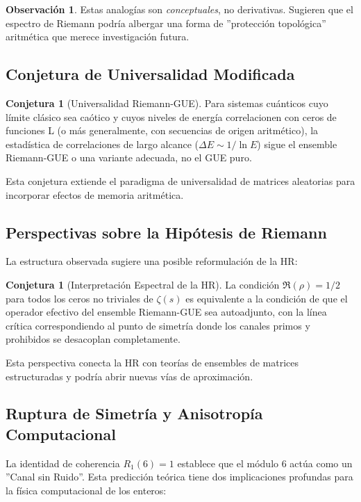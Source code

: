 \documentclass[12pt, a4paper]{article}
\theoremstyle{plain}
\theoremstyle{definition}
\newtheorem{observacion}[teorema]{Observación}
\newtheorem{conjetura}[teorema]{Conjetura}
\begin{document}
\begin{observacion}
Estas analogías son \textit{conceptuales}, no derivativas. Sugieren que el espectro de Riemann podría albergar una forma de ''protección topológica'' aritmética que merece investigación futura.
\end{observacion}

\subsection{Conjetura de Universalidad Modificada}

\begin{conjetura}[Universalidad Riemann-GUE]
Para sistemas cuánticos cuyo límite clásico sea caótico y cuyos niveles de energía correlacionen con ceros de funciones L (o más generalmente, con secuencias de origen aritmético), la estadística de correlaciones de largo alcance ($\Delta E \sim 1/\ln E$) sigue el ensemble Riemann-GUE o una variante adecuada, no el GUE puro.
\end{conjetura}

Esta conjetura extiende el paradigma de universalidad de matrices aleatorias para incorporar efectos de memoria aritmética.

\subsection{Perspectivas sobre la Hipótesis de Riemann}

La estructura observada sugiere una posible reformulación de la HR:

\begin{conjetura}[Interpretación Espectral de la HR]
La condición $\Re(\rho)=1/2$ para todos los ceros no triviales de $\zeta(s)$ es equivalente a la condición de que el operador efectivo del ensemble Riemann-GUE sea autoadjunto, con la línea crítica correspondiendo al punto de simetría donde los canales primos y prohibidos se desacoplan completamente.
\end{conjetura}

Esta perspectiva conecta la HR con teorías de ensembles de matrices estructuradas y podría abrir nuevas vías de aproximación.

\subsection{Ruptura de Simetría y Anisotropía Computacional}

La identidad de coherencia $R_1(6)=1$ establece que el módulo 6 actúa como un ''Canal sin Ruido''. Esta predicción teórica tiene dos implicaciones profundas para la física computacional de los enteros:
\end{document}
